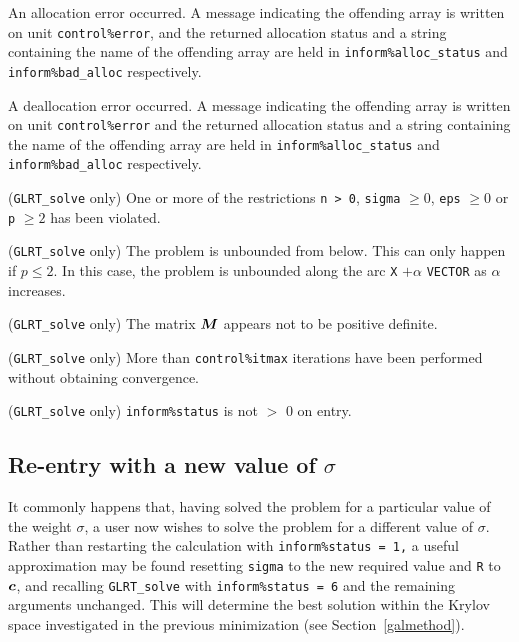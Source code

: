 \documentclass{galahad}
\newcommand{\packagename}{GL\-RT}
\begin{document}
\begin{description}
  An allocation error occurred. A message indicating
the offending
array is written on unit {\tt control\%error}, and the returned allocation
status and a string containing the name of the offending array
are held in {\tt inform\%alloc\_\-status}
and {\tt inform\%bad\_alloc} respectively.

 A deallocation error occurred.
A message indicating the offending
array is written on unit {\tt control\%error} and the returned allocation
status and a string containing the name of the offending array
are held in {\tt inform\%alloc\_\-status}
and {\tt inform\%bad\_alloc} respectively.

 ({\tt \packagename\_solve} only)
One or more of the restrictions
{\tt n > 0}, {\tt sigma} $\geq 0$, {\tt eps} $\geq 0$ or {\tt p} $\geq 2$
has been violated.

 ({\tt \packagename\_solve} only) The problem is unbounded
from below. This can only happen if $p \leq 2$. In this case, the
problem is unbounded along the arc {\tt X} $+\alpha$ {\tt VECTOR} as
$\alpha$ increases.

 ({\tt \packagename\_solve} only)
The matrix ${\bm{M}}$ appears not to be positive definite.

 ({\tt \packagename\_solve} only) More than
{\tt control\%itmax} iterations have been performed without obtaining
convergence.

 ({\tt \packagename\_solve} only)  {\tt inform\%status} is
not $>$ 0 on entry.

\end{description}


\subsection{Re-entry with a new value of $\sigma$}
It commonly happens that, having solved the problem for a particular value
of the weight $\sigma$, a user now wishes to solve the problem for a different
value of $\sigma$. Rather than restarting the calculation with
{\tt inform\%status = 1,} a useful approximation may be found
resetting {\tt sigma} to the new required value and {\tt R} to ${\bm{c}}$,
and recalling {\tt \packagename\_solve}
with {\tt inform\%status = 6} and the remaining arguments unchanged.
This will determine the best solution within the Krylov space investigated
in the previous minimization (see Section~\ref{galmethod}).
\end{document}
